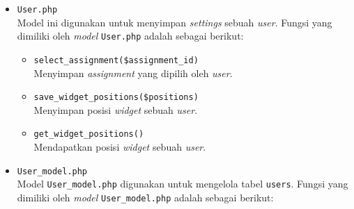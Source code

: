 \documentclass[a4paper,twoside]{article}
\begin{document}
\begin{enumerate}
\begin{itemize}
\begin{itemize}
			            \item \verb|User.php| \\
			                  Model ini digunakan untuk menyimpan \textit{settings} sebuah \textit{user}. Fungsi yang dimiliki oleh \textit{model} \verb|User.php| adalah sebagai berikut:

			                  \begin{itemize}
				                  \item \verb|select_assignment($assignment_id)| \\
				                        Menyimpan \textit{assignment} yang dipilih oleh \textit{user}.
				                  \item \verb|save_widget_positions($positions)| \\
				                        Menyimpan posisi \textit{widget} sebuah \textit{user}.
				                  \item \verb|get_widget_positions()| \\
				                        Mendapatkan posisi \textit{widget} sebuah \textit{user}.
			                  \end{itemize}

			            \item \verb|User_model.php| \\
			                  Model \verb|User_model.php| digunakan untuk mengelola tabel \verb|users|. Fungsi yang dimiliki oleh \textit{model} \verb|User_model.php| adalah sebagai berikut:


\end{itemize}
\end{itemize}
\end{enumerate}
\end{document}

